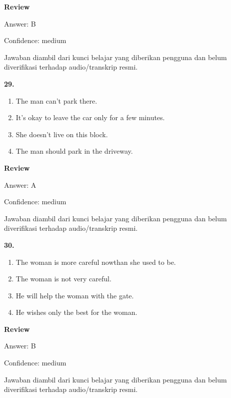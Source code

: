 \documentclass[12pt]{article}
\begin{document}
\par
\begingroup
\setlength{\parskip}{0pt}
\setlength{\parindent}{0pt}
\textbf{Review}\par
Answer: B\par
Confidence: medium\par
Jawaban diambil dari kunci belajar yang diberikan pengguna dan belum diverifikasi terhadap audio/transkrip resmi.\par
\endgroup
\par
\vspace{0.25\baselineskip}
\noindent\textbf{29.}
\begin{enumerate}[label=(\Alph*),leftmargin=*,itemsep=0.2em]
\item The man can't park there.
\item It's okay to leave the car only for a few minutes.
\item She doesn't live on this block.
\item The man should park in the driveway.
\end{enumerate}
\par
\begingroup
\setlength{\parskip}{0pt}
\setlength{\parindent}{0pt}
\textbf{Review}\par
Answer: A\par
Confidence: medium\par
Jawaban diambil dari kunci belajar yang diberikan pengguna dan belum diverifikasi terhadap audio/transkrip resmi.\par
\endgroup
\par
\vspace{0.25\baselineskip}
\noindent\textbf{30.}
\begin{enumerate}[label=(\Alph*),leftmargin=*,itemsep=0.2em]
\item The woman is more careful nowthan she used to be.
\item The woman is not very careful.
\item He will help the woman with the gate.
\item He wishes only the best for the woman.
\end{enumerate}
\par
\begingroup
\setlength{\parskip}{0pt}
\setlength{\parindent}{0pt}
\textbf{Review}\par
Answer: B\par
Confidence: medium\par
Jawaban diambil dari kunci belajar yang diberikan pengguna dan belum diverifikasi terhadap audio/transkrip resmi.\par
\endgroup
\par
\vspace{0.25\baselineskip}
\end{document}
